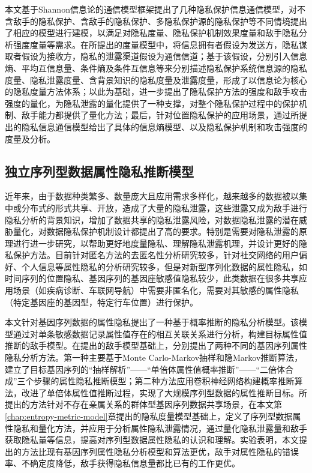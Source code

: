 本文基于Shannon信息论的通信模型框架提出了几种隐私保护信息通信模型，对不含敌手的隐私保护、含敌手的隐私保护、多隐私保护源的隐私保护等不同情境提出了相应的模型进行建模，以满足对隐私度量、隐私保护机制效果度量和敌手隐私分析强度度量等需求。在所提出的度量模型中，将信息拥有者假设为发送方，隐私谋取者假设为接收方，隐私的泄露渠道假设为通信信道；基于该假设，分别引入信息熵、平均互信息量、条件熵及条件互信息等来分别描述隐私保护系统信息源的隐私度量、隐私泄露度量、含背景知识的隐私度量及泄露度量，形成了以信息论为核心的隐私度量方法体系；以此为基础，进一步提出了隐私保护方法的强度和敌手攻击强度的量化，为隐私泄露的量化提供了一种支撑，对整个隐私保护过程中的保护机制、敌手能力都提供了量化方法；最后，针对位置隐私保护的应用场景，通过所提出的隐私信息通信模型给出了具体的信息熵模型、以及隐私保护机制和攻击强度的度量及分析。
\subsection{独立序列型数据属性隐私推断模型}
近年来，由于数据种类繁多、数量庞大且应用需求多样化，越来越多的数据被以集中或分布式的形式共享、开放，造成了大量的隐私泄露，这些泄露又成为敌手进行隐私分析的背景知识，增加了数据共享的隐私泄露风险，对数据隐私泄露的潜在威胁量化，对数据隐私保护机制设计都提出了高的要求。特别是需要对隐私泄露的原理进行进一步研究，以帮助更好地度量隐私、理解隐私泄露机理，并设计更好的隐私保护方法。目前针对匿名方法的去匿名性分析研究较多，针对社交网络的用户偏好、个人信息等属性隐私的分析研究较多，但是对新型序列化数据的属性隐私，如时间序列的位置隐私、基因序列的基因座敏感值隐私较少，此类数据在很多共享应用场景（如疾病诊断、车联网导航）中需要非匿名化，需要对其敏感的属性隐私（特定基因座的基因型，特定行车位置）进行保护。

本文针对基因序列数据的属性隐私提出了一种基于概率推断的隐私分析模型。该模型通过对单条敏感数据记录属性值存在的相互关联关系进行分析，构建目标属性值推断的敌手模型。在提出的敌手模型基础上，分别提出了两种不同的基因序列属性隐私分析方法。第一种主要基于Monte Carlo-Markov抽样和隐Markov推断算法，建立了目标基因序列的“抽样解析”——“单倍体属性值概率推断”——“二倍体合成”三个步骤的属性隐私推断模型；第二种方法应用卷积神经网络构建概率推断算法，改进了单倍体属性值推断过程，实现了大规模序列型数据的属性推断目标。所提出的方法针对不存在亲属关系的群体型基因序列数据共享场景，在本文第\ref{chap:entropy-metric-model}章提出的隐私度量模型基础上，定义了序列型数据属性隐私和量化方法，并应用于分析属性隐私泄露情况，通过量化隐私泄露量和敌手获取隐私量等信息，提高对序列型数据属性隐私的认识和理解。实验表明，本文提出的方法比现有基因序列属性隐私分析模型和算法更优，敌手对属性隐私的错误率、不确定度降低，敌手获得隐私信息量都比已有的工作更优。
